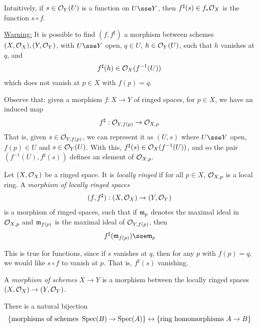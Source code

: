 \documentclass{article}
\begin{document}
\begin{addendum}
    Intuitively, if \(s \in \mathcal{O}_Y(U)\) is a function on \(U \sse Y\), then \(f^\sharp(s) \in f_*\mathcal{O}_X\) is the function \(s \circ f\).
\end{addendum}

\lec

\underline{Warning:} It is possible to find \((f, f^\sharp)\) a morphism between schemes \((X, \mathcal{O}_X), (Y, \mathcal{O}_Y)\), with \(U \sse Y\) open, \(q \in U\), \(h \in \mathcal{O}_Y(U)\), such that \(h\) vanishes at \(q\), and
\[f^\sharp(h) \in \mathcal{O}_X(f^{-1}(U))\]
which does not vanish at \(p \in X\) with \(f(p) = q\).

Observe that: given a morphism \(f : X \to Y\) of ringed spaces, for \(p \in X\), we have an induced map
\[f^\sharp : \mathcal{O}_{Y, f(p)} \to \mathcal{O}_{X, p}\]
That is, given \(s \in \mathcal{O}_{Y, f(p)}\), we can represent it as \((U, s)\) where \(U \sse Y\) open, \(f(p) \in U\) and \(s \in \mathcal{O}_Y(U)\). With this, \(f^\sharp(s) \in \mathcal{O}_X(f^{-1}(U))\), and so the pair \((f^{-1}(U), f^\sharp(s))\) defines an element of \(\mathcal{O}_{X, p}\).

\begin{definition}
    Let \((X, \mathcal{O}_X)\) be a ringed space. It is \emph{locally ringed} if for all \(p \in X\), \(\mathcal{O}_{X, p}\) is a local ring. A \emph{morphism of locally ringed spaces}
    \[(f, f^\sharp) : (X, \mathcal{O}_X) \to (Y, \mathcal{O}_Y)\]
    is a morphism of ringed spaces, such that if \(\mathfrak{m}_p\) denotes the maximal ideal in \(\mathcal{O}_{X,p}\) and \(\mathfrak{m}_{f(p)}\) is the maximal ideal of \(\mathcal{O}_{Y, f(p)}\), then
    \[f^\sharp(\mfm_{f(p)}) \sse \mfm_p\]
\end{definition}

\begin{addendum}
    This is true for functions, since if \(s\) vanishes at \(q\), then for any \(p\) with \(f(p) = q\), we would like \(s \circ f\) to vanish at \(p\). That is, \(f^\sharp(s)\) vanishing.
\end{addendum}

\begin{definition}
     A \emph{morphism of schemes} \(X \to Y\) is a morphism between the locally ringed spaces  \((X, \mathcal{O}_X) \to (Y, \mathcal{O}_Y)\). 
\end{definition}

\begin{theorem}
    There is a natural bijection
    \[\{\text{morphisms of schemes } \operatorname{Spec}(B) \to \operatorname{Spec}(A)\} \leftrightarrow \{\text{ring homomorphisms }A \to B\}\]
\end{theorem}
\end{document}
